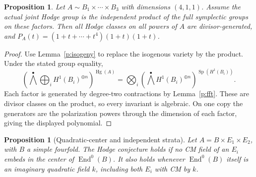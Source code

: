 \documentclass[11pt,reqno]{article}
\theoremstyle{emphasizedplain}
\newtheorem{proposition}[theorem]{Proposition}
\theoremstyle{emphasizeddefinition}
\theoremstyle{emphasizeddefinition}
\DeclareMathOperator{\End}{End}
\DeclareMathOperator{\Hg}{Hg}
\DeclareMathOperator{\Sp}{Sp}
\begin{document}
\begin{proposition}
Let $A\sim B_1\times\cdots\times B_{3}$ with dimensions
$(4,1,1)$. Assume the actual joint Hodge group is the
independent product of the full symplectic groups on these factors.
Then all Hodge classes on all powers of $A$ are divisor-generated,
and $P_A(t)=(1+t+\cdots+t^{4})(1+t)(1+t)$.
\end{proposition}
\begin{proof}
Use Lemma~\ref{p:isogeny} to replace the isogenous variety by the product.
Under the stated group equality,
\[
 \left(\bigwedge^\bullet\bigoplus_i H^1(B_i)^{\oplus n}\right)^{\Hg(A)}
 =\bigotimes_i\left(\bigwedge^\bullet H^1(B_i)^{\oplus n}\right)^{\Sp(H^1(B_i))}.
\]
Each factor is generated by degree-two contractions by Lemma~\ref{p:fft}.
These are divisor classes on the product, so every invariant is algebraic.
On one copy the generators are the polarization powers through the
dimension of each factor, giving the displayed polynomial.
\end{proof}
\begin{proposition}[Quadratic-center and independent strata]\label{p:N3strata}
Let $A=B\times E_1\times E_2$, with $B$ a simple fourfold.
The Hodge conjecture holds if no CM field of an $E_i$ embeds in the
center of $\End^0(B)$. It also holds whenever $\End^0(B)$ itself is
an imaginary quadratic field $k$, including both $E_i$ with CM by $k$.
\end{proposition}
\end{document}
